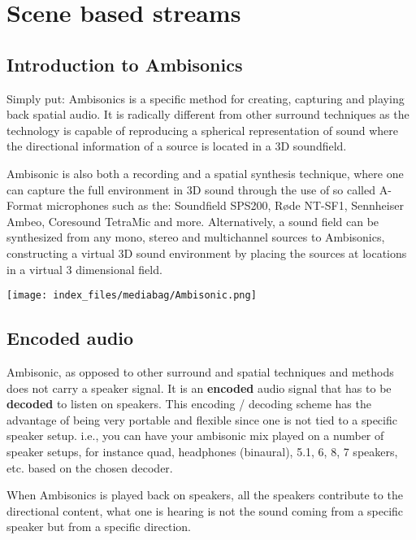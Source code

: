 \documentclass[
  letterpaper,
  DIV=11,
  numbers=noendperiod]{scrreport}
\begin{document}
\hypertarget{scene-based-streams}{%
\chapter{Scene based streams}\label{scene-based-streams}}

\hypertarget{introduction-to-ambisonics}{%
\section{Introduction to Ambisonics}\label{introduction-to-ambisonics}}

Simply put: Ambisonics is a specific method for creating, capturing and
playing back spatial audio. It is radically different from other
surround techniques as the technology is capable of reproducing a
spherical representation of sound where the directional information of a
source is located in a 3D soundfield.

Ambisonic is also both a recording and a spatial synthesis technique,
where one can capture the full environment in 3D sound through the use
of so called A-Format microphones such as the: Soundfield SPS200, Røde
NT-SF1, Sennheiser Ambeo, Coresound TetraMic and more. Alternatively, a
sound field can be synthesized from any mono, stereo and multichannel
sources to Ambisonics, constructing a virtual 3D sound environment by
placing the sources at locations in a virtual 3 dimensional field.

\texttt{[image: index\_files/mediabag/Ambisonic.png]}

\hypertarget{encoded-audio}{%
\section{Encoded audio}\label{encoded-audio}}

Ambisonic, as opposed to other surround and spatial techniques and
methods does not carry a speaker signal. It is an \textbf{encoded} audio
signal that has to be \textbf{decoded} to listen on speakers. This
encoding / decoding scheme has the advantage of being very portable and
flexible since one is not tied to a specific speaker setup. i.e., you
can have your ambisonic mix played on a number of speaker setups, for
instance quad, headphones (binaural), 5.1, 6, 8, 7 speakers, etc. based
on the chosen decoder.

When Ambisonics is played back on speakers, all the speakers contribute
to the directional content, what one is hearing is not the sound coming
from a specific speaker but from a specific direction.
\end{document}
